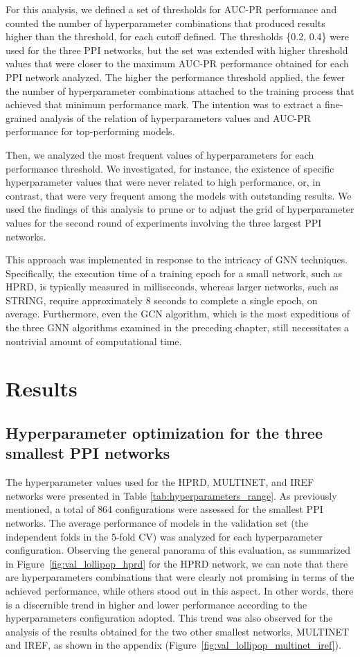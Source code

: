 For this analysis, we defined a set of thresholds for AUC-PR performance and counted the number of hyperparameter combinations that produced results higher than the threshold, for each cutoff defined. The thresholds \{0.2, 0.4\} were used for the three PPI networks, but the set was extended with higher threshold values that were closer to the maximum AUC-PR performance obtained for each PPI network analyzed. The higher the performance threshold applied, the fewer the number of hyperparameter combinations attached to the training process that achieved that minimum performance mark. The intention was to extract a fine-grained analysis of the relation of hyperparameters values and AUC-PR performance for top-performing models.

Then, we analyzed the most frequent values of hyperparameters for each performance threshold. We investigated, for instance, the existence of specific hyperparameter values that were never related to high performance, or, in contrast, that were very frequent among the models with outstanding results. We used the findings of this analysis to prune or to adjust the grid of hyperparameter values for the second round of experiments involving the three largest PPI networks. 

This approach was implemented in response to the intricacy of GNN techniques. Specifically, the execution time of a training epoch for a small network, such as HPRD, is typically measured in milliseconds, whereas larger networks, such as STRING, require approximately 8 seconds to complete a single epoch, on average. Furthermore, even the GCN algorithm, which is the most expeditious of the three GNN algorithms examined in the preceding chapter, still necessitates a nontrivial amount of computational time.

\section{Results}

\subsection{Hyperparameter optimization for the three smallest PPI networks}


The hyperparameter values used for the HPRD, MULTINET, and IREF networks were presented in Table \ref{tab:hyperparameters_range}. As previously mentioned, a total of 864 configurations were assessed for the smallest PPI networks. The average performance of models in the validation set (\ie the independent folds in the 5-fold CV) was analyzed for each hyperparameter configuration. 
Observing the general panorama of this evaluation, as summarized in Figure~\ref{fig:val_lollipop_hprd} for the HPRD network, we can note that there are hyperparameters combinations that were clearly not promising in terms of the achieved performance, while others stood out in this aspect. In other words, there is a discernible trend in higher and lower performance according to the hyperparameters configuration adopted. This trend was also observed for the analysis of the results obtained for the two other smallest networks, MULTINET and IREF, as shown in the appendix (Figure~\ref{fig:val_lollipop_multinet_iref}).


